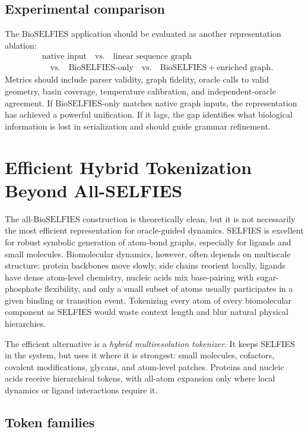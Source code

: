 \documentclass[11pt]{article}
\newcommand{\bioselfies}{\mathrm{BioSELFIES}}
\begin{document}
\subsection{Experimental comparison}

The $\bioselfies$ application should be evaluated as another representation ablation:
\[
\begin{aligned}
&\text{native input}
\quad\text{vs.}\quad
\text{linear sequence graph}\\
&\quad\text{vs.}\quad
\bioselfies\text{-only}
\quad\text{vs.}\quad
\bioselfies+\text{enriched graph}.
\end{aligned}
\]
Metrics should include parser validity, graph fidelity, oracle calls to valid geometry, basin coverage, temperature calibration, and independent-oracle agreement. If $\bioselfies$-only matches native graph inputs, the representation has achieved a powerful unification. If it lags, the gap identifies what biological information is lost in serialization and should guide grammar refinement.

\section{Efficient Hybrid Tokenization Beyond All-SELFIES}

The all-$\bioselfies$ construction is theoretically clean, but it is not necessarily the most efficient representation for oracle-guided dynamics. SELFIES is excellent for robust symbolic generation of atom-bond graphs, especially for ligands and small molecules. Biomolecular dynamics, however, often depends on multiscale structure: protein backbones move slowly, side chains reorient locally, ligands have dense atom-level chemistry, nucleic acids mix base-pairing with sugar-phosphate flexibility, and only a small subset of atoms usually participates in a given binding or transition event. Tokenizing every atom of every biomolecular component as SELFIES would waste context length and blur natural physical hierarchies.

The efficient alternative is a \emph{hybrid multiresolution tokenizer}. It keeps SELFIES in the system, but uses it where it is strongest: small molecules, cofactors, covalent modifications, glycans, and atom-level patches. Proteins and nucleic acids receive hierarchical tokens, with all-atom expansion only where local dynamics or ligand interactions require it.

\subsection{Token families}
\end{document}
